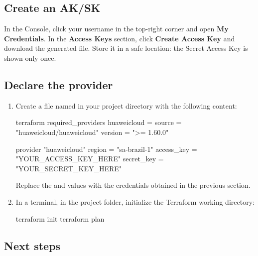 \documentclass[english]{guide}
\begin{document}
\subsection{Create an AK/SK}


In the Console, click your username in the top-right corner and open
\textbf{My Credentials}. In the \textbf{Access Keys} section, click
\textbf{Create Access Key} and download the generated file. Store it in a
safe location: the Secret Access Key is shown only once.

\subsection{Declare the provider}

\passoapasso
\begin{enumerate}
  \item Create a file named  in your project directory
        with the following content:

  \begin{codigo}
terraform {
  required_providers {
    huaweicloud = {
      source  = "huaweicloud/huaweicloud"
      version = ">= 1.60.0"
    }
  }
}

provider "huaweicloud" {
  region     = "sa-brazil-1"
  access_key = "YOUR_ACCESS_KEY_HERE"
  secret_key = "YOUR_SECRET_KEY_HERE"
}
  \end{codigo}

  Replace the  and  values with the
  credentials obtained in the previous section.

  \item In a terminal, in the project folder, initialize the Terraform
        working directory:

  \begin{codigo}[bash]
terraform init
terraform plan
  \end{codigo}

\end{enumerate}

\subsection{Next steps}
\end{document}
